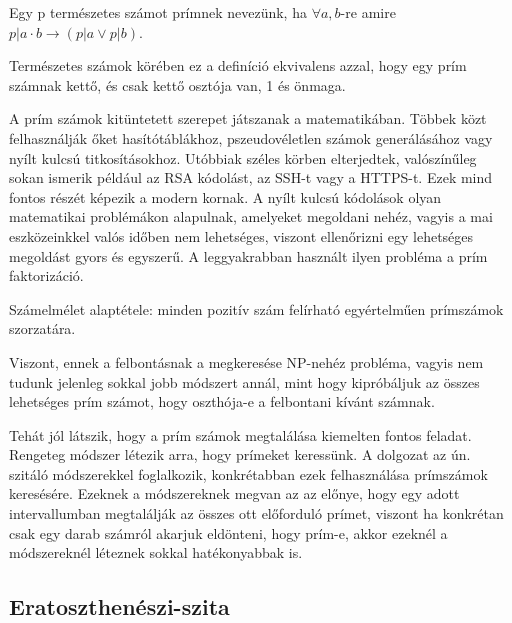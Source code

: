 \documentclass[twoside, a4paper, 12pt]{article}
\begin{document}
\begin{definition} Egy p természetes számot prímnek nevezünk, ha \(\forall a,b\)-re amire \(p|a \cdot b \rightarrow (p|a \vee p|b)\). \end{definition}
Természetes számok körében ez a definíció ekvivalens azzal, hogy egy prím számnak kettő, és csak kettő osztója van, 1 és önmaga. \par
A prím számok kitüntetett szerepet játszanak a matematikában. Többek közt felhasználják őket hasítótáblákhoz, pszeudovéletlen számok generálásához vagy nyílt kulcsú titkosításokhoz. Utóbbiak széles körben elterjedtek, valószínűleg sokan ismerik például az RSA kódolást, az SSH-t vagy a HTTPS-t. Ezek mind fontos részét képezik a modern kornak. A nyílt kulcsú kódolások olyan matematikai problémákon alapulnak, amelyeket megoldani nehéz, vagyis a mai eszközeinkkel valós időben nem lehetséges, viszont ellenőrizni egy lehetséges megoldást gyors és egyszerű. A leggyakrabban használt ilyen probléma a prím faktorizáció. \par
\begin{definition} Számelmélet alaptétele: minden pozitív szám felírható egyértelműen prímszámok szorzatára. \end{definition}
Viszont, ennek a felbontásnak a megkeresése NP-nehéz probléma, vagyis nem tudunk jelenleg sokkal jobb módszert annál, mint hogy kipróbáljuk az összes lehetséges prím számot, hogy oszthója-e a felbontani kívánt számnak.\par
Tehát jól látszik, hogy a prím számok megtalálása  kiemelten fontos feladat. Rengeteg módszer létezik arra, hogy prímeket keressünk. A dolgozat az ún. szitáló módszerekkel foglalkozik, konkrétabban ezek felhasználása prímszámok keresésére. Ezeknek a módszereknek megvan az az előnye, hogy egy adott intervallumban megtalálják az összes ott előforduló prímet, viszont ha konkrétan csak egy darab számról akarjuk eldönteni, hogy prím-e, akkor ezeknél a módszereknél léteznek sokkal hatékonyabbak is.

\subsection{Eratoszthenészi-szita} \cite{erat}
\end{document}
